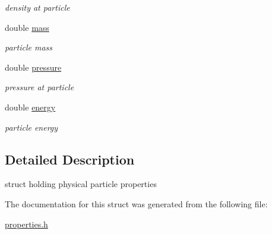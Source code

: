 \begin{DoxyCompactItemize}
\begin{DoxyCompactList}\small\item\em density at particle \end{DoxyCompactList}\item 
\hypertarget{structProperties_aded5ddc676b930dfbdfa81f78ef2547e}{double \hyperlink{structProperties_aded5ddc676b930dfbdfa81f78ef2547e}{mass}}\label{structProperties_aded5ddc676b930dfbdfa81f78ef2547e}

\begin{DoxyCompactList}\small\item\em particle mass \end{DoxyCompactList}\item 
\hypertarget{structProperties_a001e790a070fc788d99ab472330e70fb}{double \hyperlink{structProperties_a001e790a070fc788d99ab472330e70fb}{pressure}}\label{structProperties_a001e790a070fc788d99ab472330e70fb}

\begin{DoxyCompactList}\small\item\em pressure at particle \end{DoxyCompactList}\item 
\hypertarget{structProperties_a4150d32dbe414d5bdc2ee4143ca19831}{double \hyperlink{structProperties_a4150d32dbe414d5bdc2ee4143ca19831}{energy}}\label{structProperties_a4150d32dbe414d5bdc2ee4143ca19831}

\begin{DoxyCompactList}\small\item\em particle energy \end{DoxyCompactList}\end{DoxyCompactItemize}


\subsection{\-Detailed \-Description}
struct holding physical particle properties 

\-The documentation for this struct was generated from the following file\-:\begin{DoxyCompactItemize}
\item 
\hyperlink{properties_8h}{properties.\-h}\end{DoxyCompactItemize}
